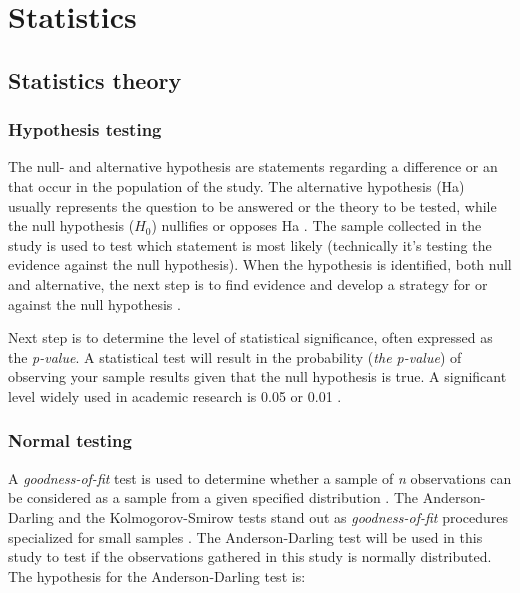 \chapter{Statistics}


\section{Statistics theory}

\subsection{Hypothesis testing}
The null- and alternative hypothesis are statements regarding a difference or an that occur in the population of the study. The alternative hypothesis (Ha) usually represents the question to be answered or the theory to be tested, while the null hypothesis ($H_{0}$) nullifies or opposes Ha \citep{Walpole2012}. The sample collected in the study is used to test which statement is most likely (technically it's testing the evidence against the null hypothesis).  When the hypothesis is identified, both null and alternative, the next step is to find evidence and develop a strategy for or against the null hypothesis \citep{LundResearchLtd2013}.

Next step is to determine the level of statistical significance, often expressed as the \textit{p-value}. A statistical test will result in the probability (\textit{the p-value}) of observing your sample results given that the null hypothesis is true. A significant level widely used in academic research is 0.05 or 0.01 \citep{Walpole2012}. 


\subsection{Normal testing}
A \textit{goodness-of-fit} test is used to determine whether a sample of \textit{n} observations can be considered as a sample from a given specified distribution \citep{Walpole2012}. The Anderson-Darling and the Kolmogorov-Smirow tests stand out as \textit{goodness-of-fit} procedures specialized for small samples \citep{Romeu2003}. The Anderson-Darling test will be used in this study to test if the observations gathered in this study is normally distributed.  %
The hypothesis for the Anderson-Darling test is: \newline

